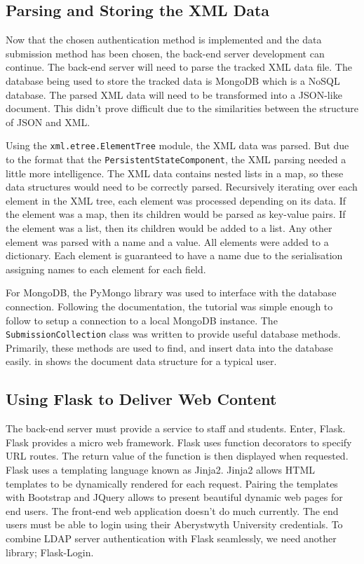 \subsection{Parsing and Storing the XML Data}
Now that the chosen authentication method is implemented and the data submission method has been chosen, the back-end server development can continue. The back-end server will need to parse the tracked XML data file. The database being used to store the tracked data is MongoDB which is a NoSQL database. The parsed XML data will need to be transformed into a JSON-like document. This didn't prove difficult due to the similarities between the structure of JSON and XML.

Using the \texttt{xml.etree.ElementTree} module, the XML data was parsed. But due to the format that the \texttt{PersistentStateComponent}, the XML parsing needed a little more intelligence. The XML data contains nested lists in a map, so these data structures would need to be correctly parsed. Recursively iterating over each element in the XML tree, each element was processed depending on its data. If the element was a map, then its children would be parsed as key-value pairs. If the element was a list, then its children would be added to a list. Any other element was parsed with a name and a value. All elements were added to a dictionary. Each element is guaranteed to have a name due to the serialisation assigning names to each element for each field.

For MongoDB, the PyMongo library was used to interface with the database connection\cite{PyMongoDocs}. Following the documentation, the tutorial was simple enough to follow to setup a connection to a local MongoDB instance. The \texttt{SubmissionCollection} class was written to provide useful database methods. Primarily, these methods are used to find, and insert data into the database easily.  in  shows the document data structure for a typical user.

\subsection{Using Flask to Deliver Web Content}
The back-end server must provide a service to staff and students. Enter, Flask. Flask provides a micro web framework. Flask uses function decorators to specify URL routes. The return value of the function is then displayed when requested. Flask uses a templating language known as Jinja2. Jinja2 allows HTML templates to be dynamically rendered for each request. Pairing the templates with Bootstrap and JQuery allows to present beautiful dynamic web pages for end users. The front-end web application doesn't do much currently. The end users must be able to login using their Aberystwyth University credentials. To combine LDAP server authentication with Flask seamlessly, we need another library; Flask-Login.

